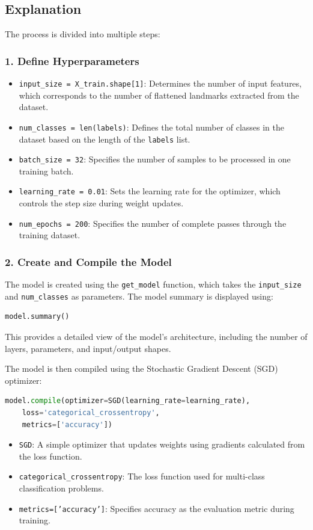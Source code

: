 \subsection*{Explanation}

The process is divided into multiple steps:

\subsubsection*{1. Define Hyperparameters}
\begin{itemize}
	\item \texttt{input\_size = X\_train.shape[1]}: Determines the number of input features, which corresponds to the number of flattened landmarks extracted from the dataset.
	\item \texttt{num\_classes = len(labels)}: Defines the total number of classes in the dataset based on the length of the \texttt{labels} list.
	\item \texttt{batch\_size = 32}: Specifies the number of samples to be processed in one training batch.
	\item \texttt{learning\_rate = 0.01}: Sets the learning rate for the optimizer, which controls the step size during weight updates.
	\item \texttt{num\_epochs = 200}: Specifies the number of complete passes through the training dataset.
\end{itemize}

\subsubsection*{2. Create and Compile the Model}
The model is created using the \texttt{get\_model} function, which takes the \texttt{input\_size} and \texttt{num\_classes} as parameters. The model summary is displayed using:
\begin{lstlisting}[language=Python]
	model.summary()
\end{lstlisting}
This provides a detailed view of the model’s architecture, including the number of layers, parameters, and input/output shapes.

The model is then compiled using the Stochastic Gradient Descent (SGD) optimizer:
\begin{lstlisting}[language=Python]
	model.compile(optimizer=SGD(learning_rate=learning_rate),
	loss='categorical_crossentropy',
	metrics=['accuracy'])
\end{lstlisting}
\begin{itemize}
	\item \texttt{SGD}: A simple optimizer that updates weights using gradients calculated from the loss function.
	\item \texttt{categorical\_crossentropy}: The loss function used for multi-class classification problems.
	\item \texttt{metrics=['accuracy']}: Specifies accuracy as the evaluation metric during training.
\end{itemize}

